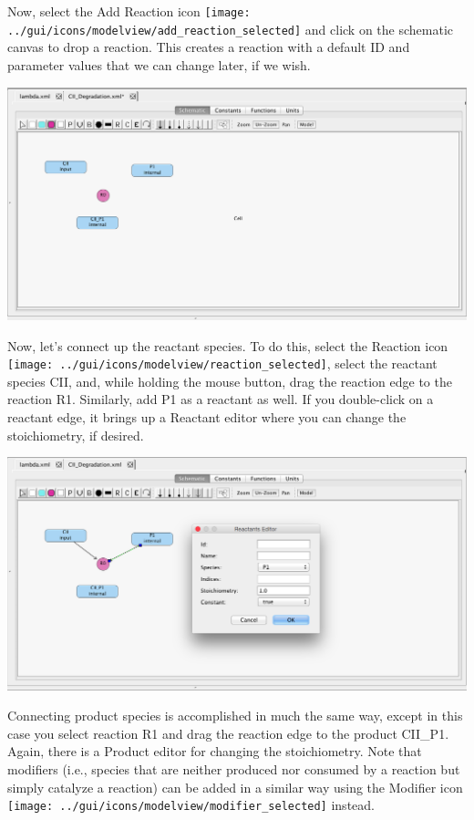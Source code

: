 \documentclass[titlepage,11pt]{article}
\begin{document}
Now, select the Add Reaction icon \texttt{[image: ../gui/icons/modelview/add\_reaction\_selected]} and click on the schematic canvas to drop a reaction.  This creates a reaction with a default ID and parameter values that we can change later, if we wish.

\begin{center}
\includegraphics[width=160mm]{screenshots/reaction}
\end{center}

Now, let's connect up the reactant species.  To do this, select the Reaction icon \texttt{[image: ../gui/icons/modelview/reaction\_selected]}, select the reactant species CII, and, while holding the mouse button, drag the reaction edge to the reaction R1.  Similarly, add P1 as a reactant as well.  If you double-click on a reactant edge, it brings up a Reactant editor where you can change the stoichiometry, if desired.

\begin{center}
\includegraphics[width=160mm]{screenshots/reactant}
\end{center}

Connecting product species is accomplished in much the same way, except in this case you select reaction R1 and drag the reaction edge to the product CII\_P1.  Again, there is a Product editor for changing the stoichiometry.  Note that modifiers (i.e., species that are neither produced nor consumed by a reaction but simply catalyze a reaction) can be added in a similar way using the Modifier icon \texttt{[image: ../gui/icons/modelview/modifier\_selected]} instead.
\end{document}

